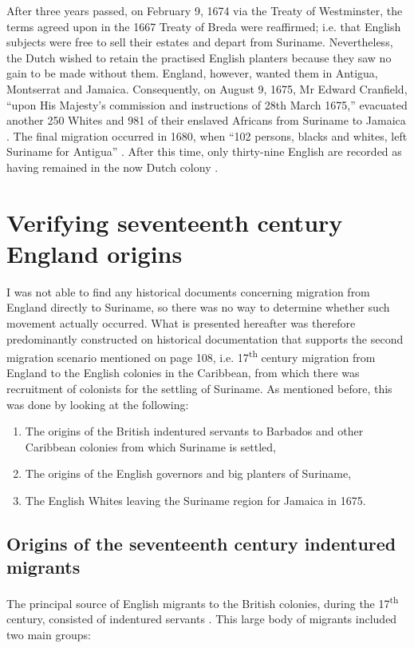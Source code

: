After three years passed, on February 9, 1674 via the Treaty of Westminster, the terms agreed upon in the 1667 Treaty of Breda were reaffirmed; i.e. that English subjects were free to sell their estates and depart from Suriname. Nevertheless, the Dutch wished to retain the practised English planters because they saw no gain to be made without them. England, however, wanted them in Antigua, Montserrat and Jamaica. Consequently, on August 9, 1675, Mr Edward Cranfield, ``upon His Majesty's commission and instructions of 28th March 1675,'' evacuated another 250 Whites and 981 of their enslaved Africans from Suriname to Jamaica \citep[No. 932]{Sainsbury93}. The final migration occurred in 1680, when ``102 persons, blacks and whites, left Suriname for Antigua'' \citep[No. 1291]{Sainsbury89c}. After this time, only thirty-nine English are recorded as having remained in the now Dutch colony \citep{Faber98, Godfrey95, Arbell02}.

\section{Verifying seventeenth century England origins}\label{6.2}
I was not able to find any historical documents concerning migration from England directly to Suriname, so there was no way to determine whether such movement actually occurred. What is presented hereafter was therefore predominantly constructed on historical documentation that supports the second migration scenario mentioned on page 108, i.e. 17\textsuperscript{th} century migration from England to the English colonies in the Caribbean, from which there was recruitment of colonists for the settling of Suriname. As mentioned before, this was done by looking at the following:

\renewcommand{\labelenumii}{\theenumii}
\begin{enumerate}
\item {The origins of the British indentured servants to Barbados and other Caribbean colonies from which Suriname is settled,}
\item{The origins of the English governors and big planters of Suriname,}
\item{The English Whites leaving the Suriname region for Jamaica in 1675.}
\end{enumerate}

\subsection{Origins of the seventeenth century indentured migrants}\label{6.2.1}
The principal source of English migrants to the British colonies, during the 17\textsuperscript{th} century, consisted of indentured servants \citep{Esposito82}. This large body of migrants included two main groups:


